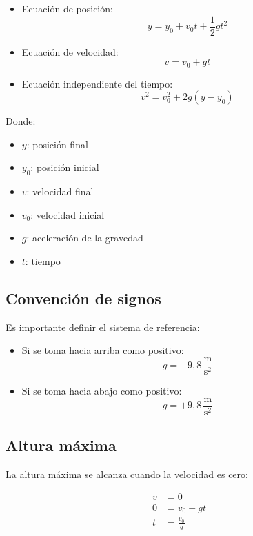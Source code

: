 \begin{itemize}
    \item Ecuación de posición:
    \[
    y = y_0 + v_0 t + \frac{1}{2}gt^2
    \]

    \item Ecuación de velocidad:
    \[
    v = v_0 + gt
    \]

    \item Ecuación independiente del tiempo:
    \[
    v^2 = v_0^2 + 2g(y - y_0)
    \]
\end{itemize}

Donde:
\begin{itemize}
    \setlength{\itemsep}{0pt}
    \item $y$: posición final
    \item $y_0$: posición inicial
    \item $v$: velocidad final
    \item $v_0$: velocidad inicial
    \item $g$: aceleración de la gravedad
    \item $t$: tiempo
\end{itemize}

\subsection{Convención de signos}

Es importante definir el sistema de referencia:

\begin{itemize}
    \setlength{\itemsep}{0pt}
    \item Si se toma hacia arriba como positivo:
    \[
    g = -9{,}8\,\frac{\text{m}}{\text{s}^2}
    \]
    \item Si se toma hacia abajo como positivo:
    \[
    g = +9{,}8\,\frac{\text{m}}{\text{s}^2}
    \]
\end{itemize}

\subsection{Altura máxima}

La altura máxima se alcanza cuando la velocidad es cero:

\vspace{-30pt}
\begin{align*}
v &= 0 \\
0 &= v_0 - gt \\
t &= \frac{v_0}{g}
\end{align*}

